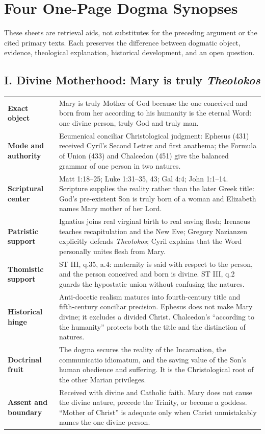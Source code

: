 \clearpage
\section{Four One-Page Dogma Synopses}

These sheets are retrieval aids, not substitutes for the preceding argument or the cited primary texts. Each preserves the difference between dogmatic object, evidence, theological explanation, historical development, and an open question.

\subsection*{I. Divine Motherhood: Mary is truly \emph{Theotokos}}
{}

\begingroup
\footnotesize
\renewcommand{\arraystretch}{1.12}
\begin{tabularx}{\textwidth}{@{}>{\raggedright\arraybackslash\bfseries}p{}X@{}}
\toprule
Exact object & Mary is truly Mother of God because the one conceived and born from her according to his humanity is the eternal Word: one divine person, truly God and truly man.\\
Mode and authority & Ecumenical conciliar Christological judgment: Ephesus (431) received Cyril's Second Letter and first anathema; the Formula of Union (433) and Chalcedon (451) give the balanced grammar of one person in two natures.\\
Scriptural center & Matt 1:18--25; Luke 1:31--35, 43; Gal 4:4; John 1:1--14. Scripture supplies the reality rather than the later Greek title: God's pre-existent Son is truly born of a woman and Elizabeth names Mary mother of her Lord.\\
Patristic support & Ignatius joins real virginal birth to real saving flesh; Irenaeus teaches recapitulation and the New Eve; Gregory Nazianzen explicitly defends \emph{Theotokos}; Cyril explains that the Word personally unites flesh from Mary.\\
Thomistic support & ST III, q.35, a.4: maternity is said with respect to the person, and the person conceived and born is divine. ST III, q.2 guards the hypostatic union without confusing the natures.\\
Historical hinge & Anti-docetic realism matures into fourth-century title and fifth-century conciliar precision. Ephesus does not make Mary divine; it excludes a divided Christ. Chalcedon's “according to the humanity” protects both the title and the distinction of natures.\\
Doctrinal fruit & The dogma secures the reality of the Incarnation, the communicatio idiomatum, and the saving value of the Son's human obedience and suffering. It is the Christological root of the other Marian privileges.\\
Assent and boundary & Received with divine and Catholic faith. Mary does not cause the divine nature, precede the Trinity, or become a goddess. “Mother of Christ” is adequate only when Christ unmistakably names the one divine person.\\
\bottomrule
\end{tabularx}

